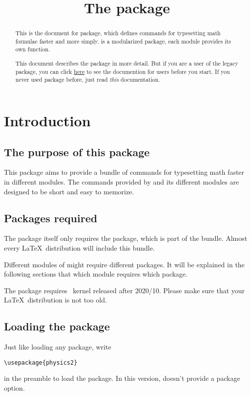 \documentclass[11pt,letterpaper]{article}
\title{The \pkg{physics2} package}
\begin{document}
\maketitle

\begin{abstract}
This is the document for  package, which defines commands for
typesetting math formulae faster and more simply.  is a
modularized package, each module provides its own function. 

This document describes the  package in more detail.
But if you are a user of the legacy  package, you can click
\hyperref{./physics2-legacy.pdf}{}{}{here} to see the documention for
 users before you start. If you never used  package
before, just read \emph{this} documentation.
\end{abstract}

\tableofcontents

\section{Introduction}
\subsection{The purpose of this package}
This package aims to provide a bundle of commands for typesetting math faster
in different modules. The commands provided by  and its different
modules are designed to be short and easy to memorize.

\subsection{Packages required}
The  package itself only requires the  package, which
is part of the  bundle. Almost every \LaTeX\ distribution
will include this bundle.

Different modules of  might require different packages. It will
be explained in the following sections that which module requires which package.

The  package requires \LaTeXe\ kernel released after 2020/10.
Please make sure that your \LaTeX\ distribution is not too old.

\subsection{Loading the  package}
Just like loading any package, write
\begin{Verbatim}
\usepackage{physics2}
\end{Verbatim}
in the preamble to load the  package. In this version,
 doesn't provide a package option.
\end{document}
